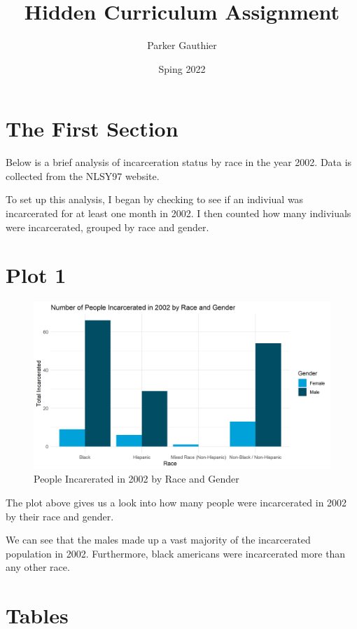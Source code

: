 \documentclass{article}
\author{Parker Gauthier}
\title{Hidden Curriculum Assignment}
\date{Sping 2022}
\begin{document}
\maketitle

\section{The First Section}

Below is a brief analysis of incarceration status by race in the year 2002.  Data is collected from the NLSY97 website.

To set up this analysis, I began by checking to see if an indiviual was incarcerated for at least one month in 2002.  I then counted how many indiviuals were incarcerated, grouped by race and gender.

\section{Plot 1}


\begin{figure}[H]
    \begin{center}
        \includegraphics[width=.85\textwidth]{inc_by_racegender}
    \end{center}
    \caption{People Incarerated in 2002 by Race and Gender}
    \label{fig:graph}
\end{figure}
The plot above gives us a look into how many people were incarcerated in 2002 by their race and gender.

We can see that the males made up a vast majority of the incarcerated population in 2002.  Furthermore, black americans were incarcerated more than any other race.

\section{Tables}
\end{document}
